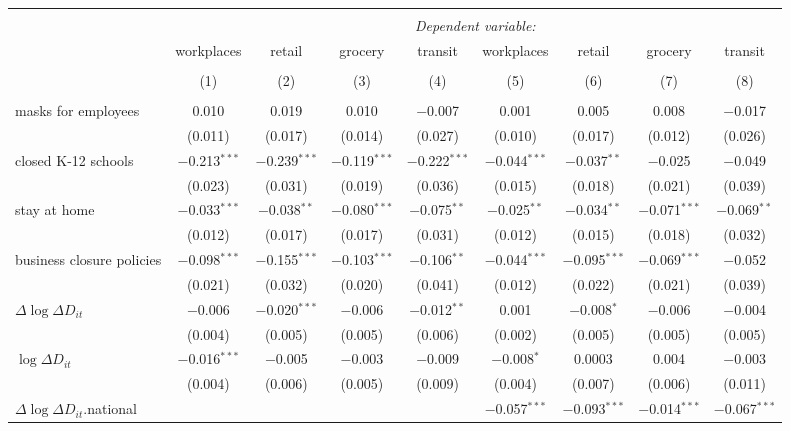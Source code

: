 \begin{tabular}{@{\extracolsep{1pt}}lcccccccc} 
\\[-1.8ex]\hline 
\hline \\[-1.8ex] 
 & \multicolumn{8}{c}{\textit{Dependent variable:}} \\ 
\cline{2-9} 
 & workplaces & retail & grocery & transit & workplaces & retail & grocery & transit \\ 
\\[-1.8ex] & (1) & (2) & (3) & (4) & (5) & (6) & (7) & (8)\\ 
\hline \\[-1.8ex] 
 masks for employees & 0.010 & 0.019 & 0.010 & $-$0.007 & 0.001 & 0.005 & 0.008 & $-$0.017 \\ 
  & (0.011) & (0.017) & (0.014) & (0.027) & (0.010) & (0.017) & (0.012) & (0.026) \\ 
  closed K-12 schools & $-$0.213$^{***}$ & $-$0.239$^{***}$ & $-$0.119$^{***}$ & $-$0.222$^{***}$ & $-$0.044$^{***}$ & $-$0.037$^{**}$ & $-$0.025 & $-$0.049 \\ 
  & (0.023) & (0.031) & (0.019) & (0.036) & (0.015) & (0.018) & (0.021) & (0.039) \\ 
  stay at home & $-$0.033$^{***}$ & $-$0.038$^{**}$ & $-$0.080$^{***}$ & $-$0.075$^{**}$ & $-$0.025$^{**}$ & $-$0.034$^{**}$ & $-$0.071$^{***}$ & $-$0.069$^{**}$ \\ 
  & (0.012) & (0.017) & (0.017) & (0.031) & (0.012) & (0.015) & (0.018) & (0.032) \\ 
  business closure policies & $-$0.098$^{***}$ & $-$0.155$^{***}$ & $-$0.103$^{***}$ & $-$0.106$^{**}$ & $-$0.044$^{***}$ & $-$0.095$^{***}$ & $-$0.069$^{***}$ & $-$0.052 \\ 
  & (0.021) & (0.032) & (0.020) & (0.041) & (0.012) & (0.022) & (0.021) & (0.039) \\ 
  $\Delta \log \Delta D_{it}$ & $-$0.006 & $-$0.020$^{***}$ & $-$0.006 & $-$0.012$^{**}$ & 0.001 & $-$0.008$^{*}$ & $-$0.006 & $-$0.004 \\ 
  & (0.004) & (0.005) & (0.005) & (0.006) & (0.002) & (0.005) & (0.005) & (0.005) \\ 
  $\log \Delta D_{it}$ & $-$0.016$^{***}$ & $-$0.005 & $-$0.003 & $-$0.009 & $-$0.008$^{*}$ & 0.0003 & 0.004 & $-$0.003 \\ 
  & (0.004) & (0.006) & (0.005) & (0.009) & (0.004) & (0.007) & (0.006) & (0.011) \\ 
  $\Delta \log \Delta D_{it}$.national &  &  &  &  & $-$0.057$^{***}$ & $-$0.093$^{***}$ & $-$0.014$^{***}$ & $-$0.067$^{***}$ \\ 

\end{tabular}
